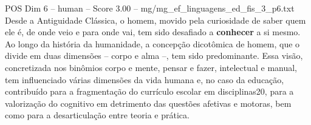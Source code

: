 \begin{textsample}{POS Dim 6 – human – Score 3.00 – mg/mg\_ef\_linguagens\_ed\_fis\_3\_p6.txt}  \label{ex:f6_pos_012}
Desde a Antiguidade Clássica, o homem, movido pela curiosidade de saber quem ele é, de onde veio e para onde vai, tem sido desafiado a \textbf{conhecer} a si mesmo.
Ao longo da história da humanidade, a concepção dicotômica de homem, que o divide em duas dimensões – corpo e alma –, tem sido predominante.
Essa visão, concretizada nos binômios corpo e mente, pensar e fazer, intelectual e manual, tem influenciado várias dimensões da vida humana e, no caso da educação, contribuído para a fragmentação do currículo escolar em disciplinas20, para a valorização do cognitivo em detrimento das questões afetivas e motoras, bem como para a desarticulação entre teoria e prática.

\end{textsample}

